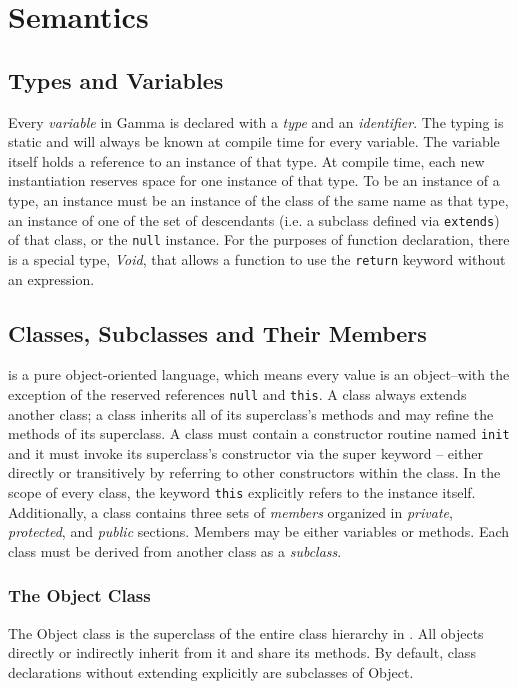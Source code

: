 \section{Semantics}
\subsection{Types and Variables}
Every \textit{variable} in Gamma is declared with a \textit{type} and an \textit{identifier}. The typing is static and will always be known at compile time for every variable. The variable itself holds a reference to an instance of that type. At compile time, each new instantiation reserves space for one instance of that type. To be an instance of a type, an instance must be an instance of the class of the same name as that type, an instance of one of the set of descendants (i.e. a subclass defined via \verb!extends!) of that class, or the {\tt null} instance. For the purposes of function declaration, there is a special type, \textit{Void}, that allows a function to use the \verb!return! keyword without an expression.

\subsection{Classes, Subclasses and Their Members}
\Lang{} is a pure object-oriented language, which means every value is an object--with the exception of the reserved references \verb!null! and \verb!this!. A class always extends another class; a class inherits all of its superclass's methods and may refine the methods of its superclass. A class must contain a constructor routine named {\tt init} and it must invoke its superclass's constructor via the super keyword -- either directly or transitively by referring to other constructors within the class. In the scope of every class, the keyword \verb!this! explicitly refers to the instance itself. Additionally, a class contains three sets of \textit{members} organized in \textit{private}, \textit{protected}, and \textit{public} sections. Members may be either variables or methods. Each class must be derived from another class as a \textit{subclass}.

\subsubsection{The Object Class}
The Object class is the superclass of the entire class hierarchy in \Lang{}. All objects directly or indirectly inherit from it and share its methods. By default, class declarations without extending explicitly are subclasses of Object.

